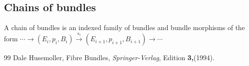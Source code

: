 \documentclass[10pt,a4paper]{amsart}
\begin{document}
\subsection{Chains of bundles}
A chain of bundles  is an indexed family of bundles and bundle morphisms of the form $\cdots \rightarrow (E_i, p_i, B_i) \stackrel{s_i}{\rightarrow} (E_{i+1}, p_{i+1} ,B_{i+1})  \rightarrow \cdots$

\begin{thebibliography}{99}
 Dale Husemoller, {Fibre Bundles}, {\small \it Springer-Verlag}, {Edition \small \bf 3,}(1994).
\end{thebibliography}
\end{document}
